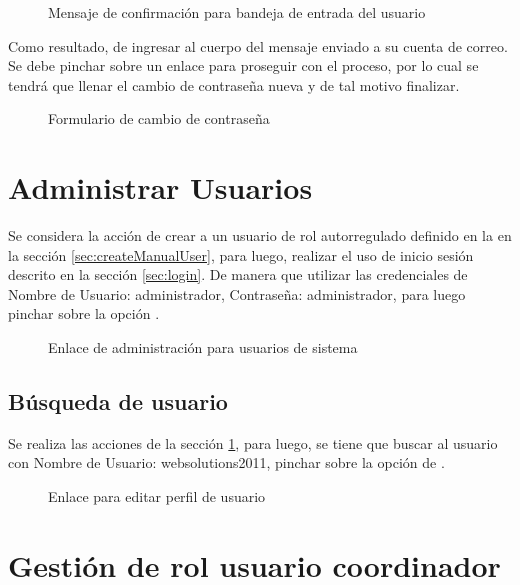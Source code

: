 \begin{figure}[!ht]
\centering
		\caption{Mensaje de confirmación para bandeja de entrada del usuario}
\end{figure}

Como resultado, de ingresar al cuerpo del mensaje enviado a su cuenta de correo.
Se debe pinchar sobre un enlace para proseguir con el proceso, por lo cual se
tendrá que llenar el cambio de contraseña nueva y de tal motivo finalizar.

\begin{figure}[H]
\centering
		\caption{Formulario de cambio de contraseña}
\end{figure}


\section{Administrar Usuarios} \label{sec:manageUser}

Se considera la acción de crear a un usuario de rol autorregulado definido en
la en la sección \ref{sec:createManualUser}, para luego, realizar el uso
de inicio sesión descrito en la sección \ref{sec:login}. De manera que utilizar
las credenciales de Nombre de Usuario: administrador, Contraseña: administrador,
para luego pinchar sobre la opción .

\begin{figure}[!ht]
\centering
		\caption{Enlace de administración para usuarios de sistema}
\end{figure}

\subsection{Búsqueda de usuario} \label{ssec:searchUser}

Se realiza las acciones de la sección \ref{sec:manageUser}, para luego, se
tiene que buscar al usuario con Nombre de Usuario: websolutions2011, pinchar
sobre la opción de . 
 
\begin{figure}[!ht]
\centering
		\caption{Enlace para editar perfil de usuario}
\end{figure}

\section{Gestión de rol usuario coordinador} \label{sec:manageCoordinator}


